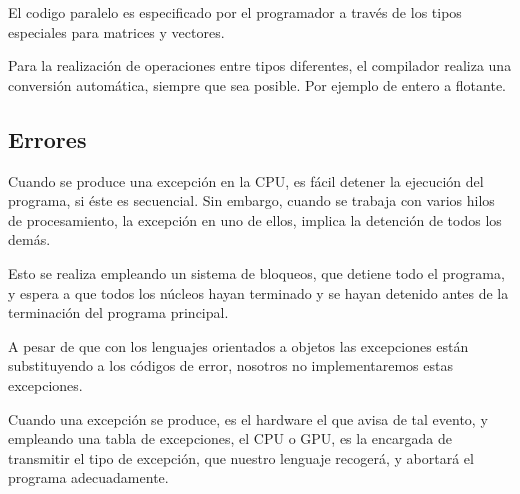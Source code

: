\documentclass[12pt,a4paper]{article}
\begin{document}
El codigo paralelo es especificado por el programador a través de los tipos 
especiales para matrices y vectores.

Para la realización de operaciones entre tipos diferentes, el compilador realiza 
una conversión automática, siempre que sea posible. Por ejemplo de entero a 
flotante.

\subsection{Errores}
Cuando se produce una excepción en la CPU, es fácil detener la ejecución del 
programa, si éste es secuencial. Sin embargo, cuando se trabaja con varios hilos 
de procesamiento, la excepción en uno de ellos, implica la detención de todos 
los demás.

Esto se realiza empleando un sistema de bloqueos, que detiene todo el programa, 
y espera a que todos los núcleos hayan terminado y se hayan detenido antes de la 
terminación del programa principal.

A pesar de que con los lenguajes orientados a objetos las excepciones están 
substituyendo a los códigos de error, nosotros no implementaremos estas 
excepciones.

Cuando una excepción se produce, es el hardware el que avisa de tal evento, y 
empleando una tabla de excepciones, el CPU o GPU, es la encargada de transmitir 
el tipo de excepción, que nuestro lenguaje recogerá, y abortará el programa 
adecuadamente.
\end{document}
